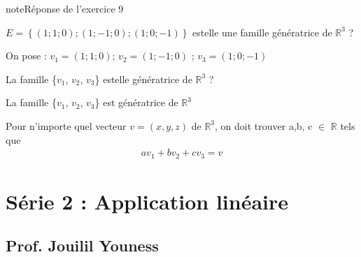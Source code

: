 \documentclass[letterpaper,10pt,french]{jupyterBook}
\begin{document}
\begin{sphinxadmonition}{note}{Réponse de l’exercice 9}

\sphinxAtStartPar
\(E = \left\{(1; 1; 0); (1;-1; 0); (1; 0; -1)\right\}\) est\sphinxhyphen{}elle une famille génératrice de \(\mathbb{R}^3\) ?

\sphinxAtStartPar
On pose : \(v_1 = (1; 1; 0)\); \(v_2=(1;-1; 0)\) ; \(v_3= (1; 0; -1)\)

\sphinxAtStartPar
La famille \{\(v_1\), \(v_2\), \(v_3\)\} est\sphinxhyphen{}elle génératrice de \(\mathbb{R}^3\) ?

\sphinxAtStartPar
La famille \{\(v_1\), \(v_2\), \(v_3\)\} est génératrice de \(\mathbb{R}^3\)

\sphinxAtStartPar
Pour n’importe quel vecteur \(v = (x, y,z)\) de \(\mathbb{R}^3\), on doit trouver a,b, c \(\in\) \(\mathbb{R}\) tels que
\begin{equation*}
\begin{split}
av_1 +bv_2 +cv_3 = v
\end{split}
\end{equation*}\end{sphinxadmonition}

\begin{sphinxVerbatim}[commandchars=\\\{\}]

\end{sphinxVerbatim}


\chapter{Série 2 : Application linéaire}
\label{\detokenize{S_xe9rie2:serie-2-application-lineaire}}\label{\detokenize{S_xe9rie2::doc}}

\section{Prof. Jouilil Youness}
\label{\detokenize{S_xe9rie2:prof-jouilil-youness}}
\end{document}
